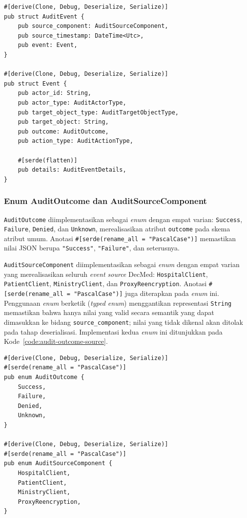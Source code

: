 \begin{listing}[ht]
\caption{Implementasi \texttt{AuditEvent} dan \texttt{Event}}
\label{code:audit-event}
\begin{verbatim}
#[derive(Clone, Debug, Deserialize, Serialize)]
pub struct AuditEvent {
    pub source_component: AuditSourceComponent,
    pub source_timestamp: DateTime<Utc>,
    pub event: Event,
}

#[derive(Clone, Debug, Deserialize, Serialize)]
pub struct Event {
    pub actor_id: String,
    pub actor_type: AuditActorType,
    pub target_object_type: AuditTargetObjectType,
    pub target_object: String,
    pub outcome: AuditOutcome,
    pub action_type: AuditActionType,

    #[serde(flatten)]
    pub details: AuditEventDetails,
}
\end{verbatim}
\end{listing}

\subsubsection{Enum AuditOutcome dan AuditSourceComponent}

\texttt{AuditOutcome} diimplementasikan sebagai \textit{enum} dengan empat
varian: \texttt{Success}, \texttt{Failure}, \texttt{Denied}, dan
\texttt{Unknown}, merealisasikan atribut \texttt{outcome} pada skema atribut
umum. Anotasi \texttt{\#[serde(rename\_all = "PascalCase")]} memastikan nilai
JSON berupa \texttt{"Success"}, \texttt{"Failure"}, dan seterusnya.

\texttt{AuditSourceComponent} diimplementasikan sebagai \textit{enum} dengan
empat varian yang merealisasikan seluruh \textit{event source} DecMed:
\texttt{HospitalClient}, \texttt{PatientClient}, \texttt{MinistryClient}, dan
\texttt{ProxyReencryption}. Anotasi \texttt{\#[serde(rename\_all = "PascalCase")]}
juga diterapkan pada \textit{enum} ini. Penggunaan \textit{enum} berketik
(\textit{typed enum}) menggantikan representasi \texttt{String} memastikan
bahwa hanya nilai yang valid secara semantik yang dapat dimasukkan ke bidang
\texttt{source\_component}; nilai yang tidak dikenal akan ditolak pada tahap
deserialisasi. Implementasi kedua \textit{enum} ini ditunjukkan pada
Kode~\ref{code:audit-outcome-source}.

\begin{listing}[ht]
\caption{Implementasi \texttt{AuditOutcome} dan \texttt{AuditSourceComponent}}
\label{code:audit-outcome-source}
\begin{verbatim}
#[derive(Clone, Debug, Deserialize, Serialize)]
#[serde(rename_all = "PascalCase")]
pub enum AuditOutcome {
    Success,
    Failure,
    Denied,
    Unknown,
}

#[derive(Clone, Debug, Deserialize, Serialize)]
#[serde(rename_all = "PascalCase")]
pub enum AuditSourceComponent {
    HospitalClient,
    PatientClient,
    MinistryClient,
    ProxyReencryption,
}
\end{verbatim}
\end{listing}

